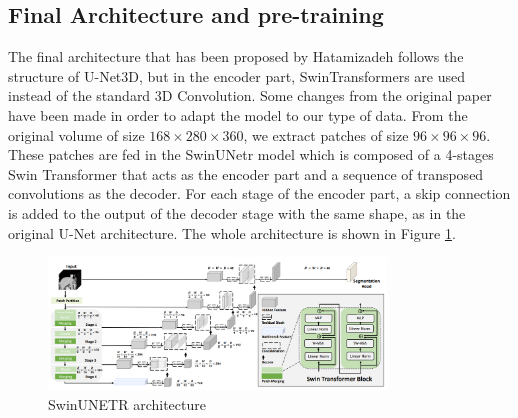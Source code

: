 \subsection{Final Architecture and pre-training}
The final architecture that has been proposed by Hatamizadeh \etal \cite{hatamizadeh2022swin} follows the
structure of U-Net3D, but in the encoder part, SwinTransformers are used instead
of the standard 3D Convolution. Some changes from the original paper have been
made in order to adapt the model to our type of data. From the original volume
of size $168 \times 280 \times 360$, we extract patches of size $96 \times 96
\times 96$. These patches are fed in the SwinUNetr model which is composed of a
4-stages Swin Transformer that acts as the encoder part and a sequence of
transposed convolutions as the decoder. For each stage of the encoder part, a
skip connection is added to the output of the decoder stage with the same shape,
as in the original U-Net architecture. The whole architecture is shown in Figure
\ref{fig:swinunetr}.

\begin{figure}[ht!]
  \centering
  \includegraphics[width=0.8\textwidth]{Images/SwinUNETR.png}
  \caption{SwinUNETR architecture}
  \label{fig:swinunetr}
\end{figure}

